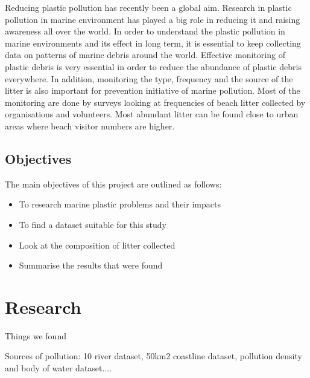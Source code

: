 \documentclass[10pt]{article}\usepackage[]{graphicx}\usepackage[]{color}
\begin{document}
Reducing plastic pollution has recently been a global aim. Research in plastic pollution in marine environment has played a big role in reducing it and raising awareness all over the world. In order to understand the plastic pollution in marine environments and its effect in long term, it is essential to keep collecting data on patterns of marine debris around the world. Effective monitoring of plastic debris is very essential in order to reduce the abundance of plastic debris everywhere. In addition, monitoring the type, frequency and the source of the litter is also important for prevention initiative of marine pollution. Most of the monitoring are done by surveys looking at frequencies of beach litter collected by organisations and volunteers.\cite{COE1997} Most abundant litter can be found close to urban areas where beach visitor numbers are higher.\cite{GARRITY1993}


\subsection{Objectives }\label{obj}

The main objectives of this project are outlined as follows:
\begin{itemize}	
\item To research marine plastic problems and their impacts
\item To find a dataset suitable for this study
\item	Look at the composition of litter collected 
\item	Summarise the results that were found
\end{itemize}

























\pagebreak
\section{Research}\label{research}

Things we found

Sources of pollution: 10 river dataset, 50km2 coastline dataset, pollution density and body of water dataset....
\end{document}
